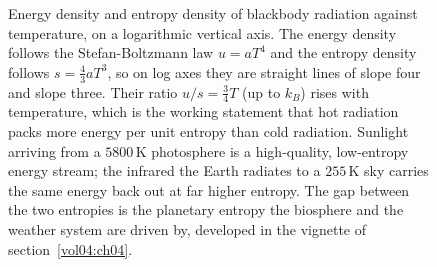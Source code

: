 \begin{figure}[htbp]
\centering
{}
\caption[Energy and entropy density of a photon gas]{Energy density and entropy
density of blackbody radiation against temperature, on a logarithmic vertical
axis. The energy density follows the Stefan-Boltzmann law $u = a T^4$ and the
entropy density follows $s = \tfrac43 a T^3$, so on log axes they are straight
lines of slope four and slope three. Their ratio $u/s = \tfrac34 T$ (up to
$k_B$) rises with temperature, which is the working statement that hot radiation
packs more energy per unit entropy than cold radiation. Sunlight arriving from a
$5800\,\si{\kelvin}$ photosphere is a high-quality, low-entropy energy stream;
the infrared the Earth radiates to a $255\,\si{\kelvin}$ sky carries the same
energy back out at far higher entropy. The gap between the two entropies is the
planetary entropy the biosphere and the weather system are driven by, developed
in the vignette of section~\ref{vol04:ch04}.}
\label{fig:vol04ch04:photon-gas-entropy}
\end{figure}

